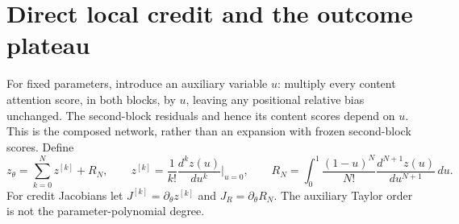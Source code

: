 \section{Direct local credit and the outcome plateau}\label{sec:direct-outcome}
For fixed parameters, introduce an auxiliary variable $u$: multiply every content attention score, in both blocks, by $u$, leaving any positional relative bias unchanged. The second-block residuals and hence its content scores depend on $u$. This is the composed network, rather than an expansion with frozen second-block scores. Define
\begin{equation}
 z_\theta=\sum_{k=0}^N z^{[k]}+R_N,\qquad
 z^{[k]}=\frac1{k!}\frac{d^kz(u)}{du^k}\bigg|_{u=0},\qquad
 R_N=\int_0^1\frac{(1-u)^N}{N!}\frac{d^{N+1}z(u)}{du^{N+1}}\,du.
 \label{eq:score-split}
\end{equation}
For credit Jacobians let $J^{[k]}=\partial_\theta z^{[k]}$ and $J_R=\partial_\theta R_N$. The auxiliary Taylor order is not the parameter-polynomial degree.

